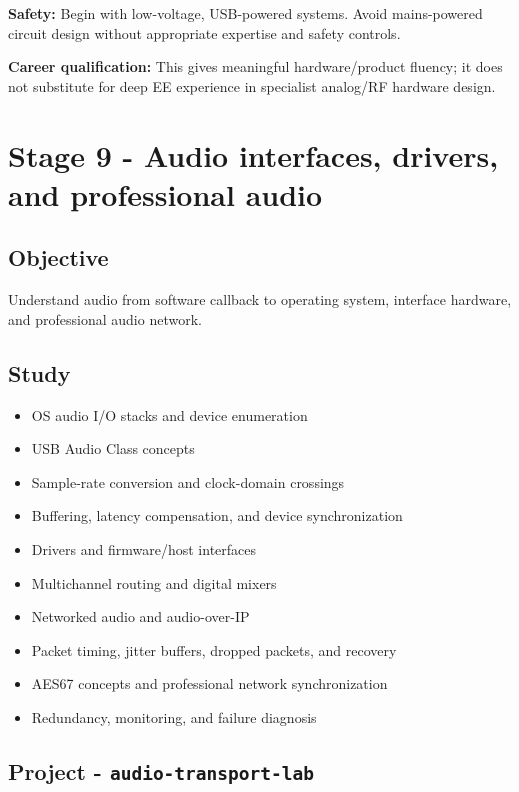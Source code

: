 \documentclass[11pt,letterpaper]{article}
\begin{document}
\textbf{Safety:} Begin with low-voltage, USB-powered systems. Avoid mains-powered circuit design without appropriate expertise and safety controls.

\textbf{Career qualification:} This gives meaningful hardware/product fluency; it does not substitute for deep EE experience in specialist analog/RF hardware design.

\clearpage

\section{Stage 9 - Audio interfaces, drivers, and professional audio}\label{stage-9-audio-interfaces-drivers-and-professional-audio}

\subsection*{Objective}\label{objective-9}

Understand audio from software callback to operating system, interface hardware, and professional audio network.

\subsection*{Study}\label{study-6}

\begin{itemize}
\item OS audio I/O stacks and device enumeration
\item USB Audio Class concepts
\item Sample-rate conversion and clock-domain crossings
\item Buffering, latency compensation, and device synchronization
\item Drivers and firmware/host interfaces
\item Multichannel routing and digital mixers
\item Networked audio and audio-over-IP
\item Packet timing, jitter buffers, dropped packets, and recovery
\item AES67 concepts and professional network synchronization
\item Redundancy, monitoring, and failure diagnosis
\end{itemize}

\subsection*{Project - \texttt{audio-transport-lab}}\label{project-audio-transport-lab}
\end{document}
